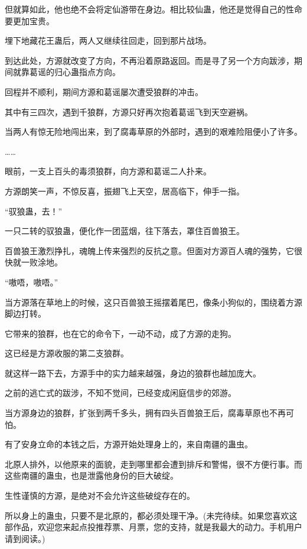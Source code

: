\begin{this_body}
但就算如此，他也绝不会将定仙游带在身边。相比较仙蛊，他还是觉得自己的性命要更加宝贵。

埋下地藏花王蛊后，两人又继续往回走，回到那片战场。

到达此处，方源就改变了方向，不再沿着原路返回。而是寻了另一个方向跋涉，期间就靠葛谣的归心蛊指点方向。

回程并不顺利，期间方源和葛谣屡次遭受狼群的冲击。

其中有三四次，遇到千狼群，方源只好再次抱着葛谣飞到天空避祸。

当两人有惊无险地闯出来，到了腐毒草原的外部时，遇到的艰难险阻便小了许多。

……

眼前，一支上百头的毒须狼群，向方源和葛谣二人扑来。

方源朗笑一声，不惊反喜，振翅飞上天空，居高临下，伸手一指。

“驭狼蛊，去！”

一只二转的驭狼蛊，便化作一团蓝烟，往下落去，罩住百兽狼王。

百兽狼王激烈挣扎，魂魄上传来强烈的反抗之意。但面对方源百人魂的强势，它很快就一败涂地。

“嗷唔，嗷唔。”

当方源落在草地上的时候，这只百兽狼王摇摆着尾巴，像条小狗似的，围绕着方源脚边打转。

它带来的狼群，也在它的命令下，一动不动，成了方源的走狗。

这已经是方源收服的第二支狼群。

就这样一路下去，方源手中的实力越来越强，身边的狼群也越加庞大。

之前的逃亡式的跋涉，不知不觉间，已经变成闲庭信步的郊游。

当方源身边的狼群，扩张到两千多头，拥有四头百兽狼王后，腐毒草原也不再可怕。

有了安身立命的本钱之后，方源开始处理身上的，来自南疆的蛊虫。

北原人排外，以他原来的面貌，走到哪里都会遭到排斥和警惕，很不方便行事。而这些南疆的蛊虫，也是泄露他身份的巨大破绽。

生性谨慎的方源，是绝对不会允许这些破绽存在的。

所以身上的蛊虫，只要不是北原的，都必须处理干净。(未完待续。如果您喜欢这部作品，欢迎您来起点投推荐票、月票，您的支持，就是我最大的动力。手机用户请到阅读。)

\end{this_body}

